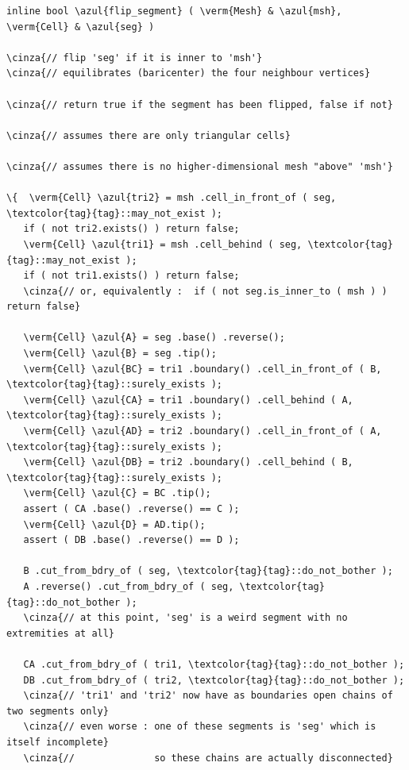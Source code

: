 \begin{Verbatim}[commandchars=\\\{\},formatcom=\small\tt,frame=single,
   label=parag-\ref{\numb section 10.\numb parag 3}.cpp,rulecolor=\color{coment},
   baselinestretch=0.94,framesep=2mm]
inline bool \azul{flip_segment} ( \verm{Mesh} & \azul{msh}, \verm{Cell} & \azul{seg} )

\cinza{// flip 'seg' if it is inner to 'msh'}
\cinza{// equilibrates (baricenter) the four neighbour vertices}

\cinza{// return true if the segment has been flipped, false if not}

\cinza{// assumes there are only triangular cells}
	
\cinza{// assumes there is no higher-dimensional mesh "above" 'msh'}

\{  \verm{Cell} \azul{tri2} = msh .cell_in_front_of ( seg, \textcolor{tag}{tag}::may_not_exist );
   if ( not tri2.exists() ) return false; 
   \verm{Cell} \azul{tri1} = msh .cell_behind ( seg, \textcolor{tag}{tag}::may_not_exist );
   if ( not tri1.exists() ) return false;
   \cinza{// or, equivalently :  if ( not seg.is_inner_to ( msh ) ) return false}

   \verm{Cell} \azul{A} = seg .base() .reverse();
   \verm{Cell} \azul{B} = seg .tip();
   \verm{Cell} \azul{BC} = tri1 .boundary() .cell_in_front_of ( B, \textcolor{tag}{tag}::surely_exists );
   \verm{Cell} \azul{CA} = tri1 .boundary() .cell_behind ( A, \textcolor{tag}{tag}::surely_exists );
   \verm{Cell} \azul{AD} = tri2 .boundary() .cell_in_front_of ( A, \textcolor{tag}{tag}::surely_exists );
   \verm{Cell} \azul{DB} = tri2 .boundary() .cell_behind ( B, \textcolor{tag}{tag}::surely_exists );
   \verm{Cell} \azul{C} = BC .tip();
   assert ( CA .base() .reverse() == C );
   \verm{Cell} \azul{D} = AD.tip();
   assert ( DB .base() .reverse() == D );
	
   B .cut_from_bdry_of ( seg, \textcolor{tag}{tag}::do_not_bother );
   A .reverse() .cut_from_bdry_of ( seg, \textcolor{tag}{tag}::do_not_bother );
   \cinza{// at this point, 'seg' is a weird segment with no extremities at all}
     
   CA .cut_from_bdry_of ( tri1, \textcolor{tag}{tag}::do_not_bother );
   DB .cut_from_bdry_of ( tri2, \textcolor{tag}{tag}::do_not_bother );
   \cinza{// 'tri1' and 'tri2' now have as boundaries open chains of two segments only}
   \cinza{// even worse : one of these segments is 'seg' which is itself incomplete}
   \cinza{//              so these chains are actually disconnected}
   

\end{Verbatim}
